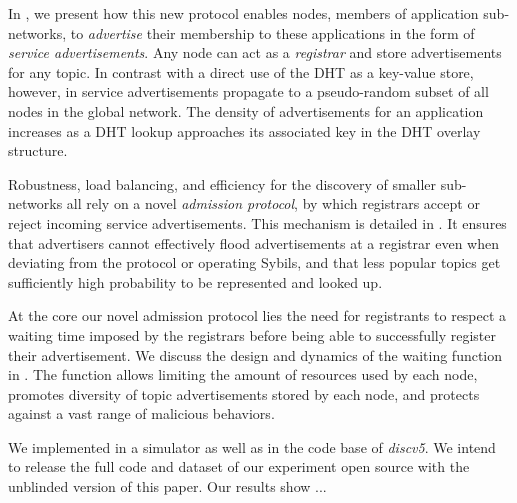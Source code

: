 In , we present how this new protocol enables nodes, members of application sub-networks, to \emph{advertise} their membership to these applications in the form of \emph{service advertisements}.
Any node can act as a \emph{registrar} and store advertisements for any topic.
In contrast with a direct use of the DHT as a key-value store, however, in \sysname service advertisements propagate to a pseudo-random subset of all nodes in the global network.
The density of advertisements for an application increases as a DHT lookup approaches its associated key in the DHT overlay structure.

Robustness, load balancing, and efficiency for the discovery of smaller sub-networks all rely on a novel \emph{admission protocol}, by which registrars accept or reject incoming service advertisements.
This mechanism is detailed in .
It ensures that advertisers cannot effectively flood advertisements at a registrar even when deviating from the protocol or operating Sybils, and that less popular topics get sufficiently high probability to be represented and looked up.  

At the core our novel admission protocol lies the need for registrants to respect a waiting time imposed by the registrars before being able to successfully register their advertisement.
We discuss the design and dynamics of the waiting function in .
The function allows limiting the amount of resources used by each node, promotes diversity of topic advertisements stored by each node, and protects against a vast range of malicious behaviors.

We implemented \sysname in a simulator as well as in the code base of \emph{discv5}. 
We intend to release the full code and dataset of our experiment open source with the unblinded version of this paper.
Our results show ...

